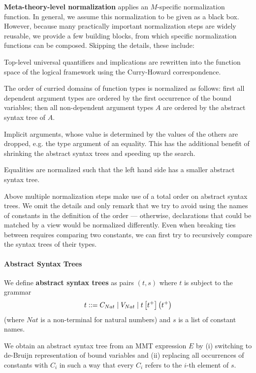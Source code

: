 \textbf{Meta-theory-level normalization} applies an $M$-specific normalization function.
In general, we assume this normalization to be given as a black box.
However, because many practically important normalization steps are widely reusable, we provide a few building blocks, from which specific normalization functions can be composed. Skipping the details, these include:
\begin{compactenum}
  \item Top-level universal quantifiers and implications are rewritten into the function space of the logical framework using the Curry-Howard correspondence.
  \item The order of curried domains of function types is normalized as follows: first all dependent argument types are ordered by the first occurrence of the bound variables; then all non-dependent argument types $A$ are ordered by the abstract syntax tree of $A$. 
  \item Implicit arguments, whose value is determined by the values of the others are dropped, e.g. the type argument of an equality.
  This has the additional benefit of shrinking the abstract syntax trees and speeding up the search.
  \item Equalities are normalized such that the left hand side has a smaller abstract syntax tree.
\end{compactenum}
Above multiple normalization steps make use of a total order on abstract syntax trees.
We omit the details and only remark that we try to avoid using the names of constants in the definition of the order --- otherwise, declarations that could be matched by a view would be normalized differently.
Even when breaking ties between requires comparing two constants, we can first try to recursively compare the syntax trees of their types.

\paragraph{Abstract Syntax Trees} We define \textbf{abstract syntax trees} as pairs $(t,s)$ where $t$ is subject to the grammar
 \[t ::= C_{Nat} \mid V_{Nat} \mid t\left[t^+\right]\left(t^+\right)\]
(where $Nat$ is a non-terminal for natural numbers) and $s$ is a list of constant names.

We obtain an abstract syntax tree from an MMT expression $E$ by (i) switching to de-Bruijn representation of bound variables and (ii) replacing all occurrences of constants with $C_i$ in such a way that every $C_i$ refers to the $i$-th element of $s$.

